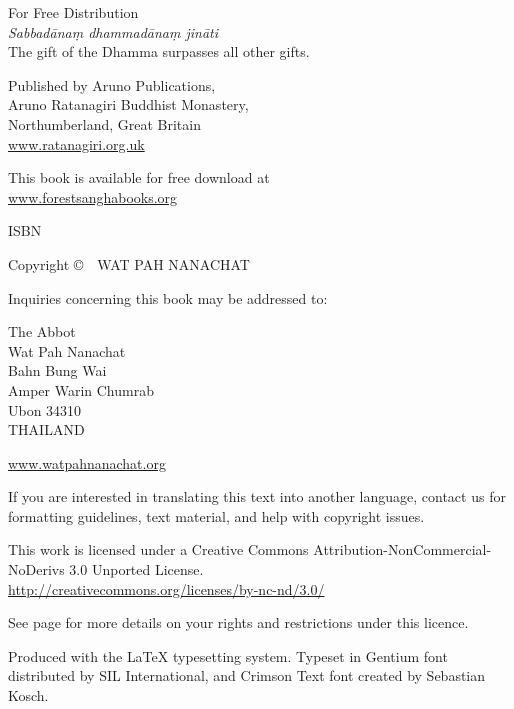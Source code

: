 {\small\setlength{\parskip}{0.8em}\setlength{\parindent}{0em}%
{\raggedright%

\thetitle

For Free Distribution\\
\emph{Sabbadānaṃ dhammadānaṃ jināti}\\
The gift of the Dhamma surpasses all other gifts.

Published by Aruno Publications,\\
Aruno Ratanagiri Buddhist Monastery,\\
Northumberland, Great Britain\\
\href{http://ratanagiri.org.uk/}{www.ratanagiri.org.uk}

This book is available for free download at\\
\href{http://forestsanghabooks.org/}{www.forestsanghabooks.org}

ISBN \theISBN

Copyright \copyright\ \the\year\ WAT PAH NANACHAT

Inquiries concerning this book may be addressed to:

The Abbot\\
Wat Pah Nanachat\\
Bahn Bung Wai\\
Amper Warin Chumrab\\
Ubon 34310\\
THAILAND

\href{http://www.watpahnanachat.org/}{www.watpahnanachat.org}

\vfill

{\footnotesize
If you are interested in translating this text into another language, contact us for formatting guidelines, text material, and help with copyright issues.

This work is licensed under a Creative Commons Attribution-NonCommercial-NoDerivs 3.0 Unported License.\\
\href{http://creativecommons.org/licenses/by-nc-nd/3.0/}{http://creativecommons.org/licenses/by-nc-nd/3.0/}

See page \pageref{copyright-details} for more details on your rights and restrictions under this licence.

Produced with the {\selectfont\LaTeX} typesetting system. Typeset in Gentium font distributed by SIL International, and Crimson Text font created by Sebastian Kosch.

\theEditionInfo

}

}}


